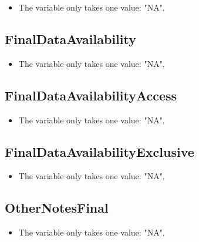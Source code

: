 \documentclass[]{article}
\providecommand{\tightlist}{%
  \setlength{\itemsep}{0pt}\setlength{\parskip}{0pt}}
\newcommand{\fullline}{\noindent\makebox[\linewidth]{\rule{\textwidth}{0.4pt}}}
\begin{document}
\begin{itemize}
\tightlist
\item
  The variable only takes one value: "NA".
\end{itemize}

\fullline

\hypertarget{finaldataavailability}{\subsection{FinalDataAvailability}\label{finaldataavailability}}

\begin{itemize}
\tightlist
\item
  The variable only takes one value: "NA".
\end{itemize}

\fullline

\hypertarget{finaldataavailabilityaccess}{\subsection{FinalDataAvailabilityAccess}\label{finaldataavailabilityaccess}}

\begin{itemize}
\tightlist
\item
  The variable only takes one value: "NA".
\end{itemize}

\fullline

\hypertarget{finaldataavailabilityexclusive}{\subsection{FinalDataAvailabilityExclusive}\label{finaldataavailabilityexclusive}}

\begin{itemize}
\tightlist
\item
  The variable only takes one value: "NA".
\end{itemize}

\fullline

\hypertarget{othernotesfinal}{\subsection{OtherNotesFinal}\label{othernotesfinal}}

\begin{itemize}
\tightlist
\item
  The variable only takes one value: "NA".
\end{itemize}
\end{document}
